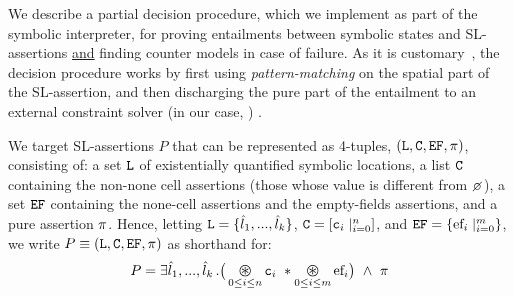 
We describe a partial decision procedure, which we  
implement as part of the \jsil symbolic interpreter, for proving entailments 
between symbolic states and SL-assertions \underline{and} finding counter 
models in case of failure.  
As it is customary~\cite{javert}, the decision procedure works by first using \emph{pattern-matching} 
on the spatial part of the SL-assertion, and then discharging the pure part of the 
entailment to an external constraint solver (in our case, \rosette) . 

We target SL-assertions $P$ that can be represented as 4-tuples,
$(\mathtt{L}, \mathtt{C}, \mathtt{EF}, \pi)$, consisting of: 
 a set $\mathtt{L}$ of existentially quantified symbolic locations, 
 a list $\mathtt{C}$ containing the non-none cell assertions (those whose value is different from $\none$), 
 a set $\mathtt{EF}$ containing the none-cell assertions and the empty-fields assertions, and
 a pure assertion $\pi$. 
Hence, letting $\mathtt{L} = \{ \hat{l}_1, ..., \hat{l}_k \}$, $\mathtt{C} = [ \mathtt{c}_i \mid_{i = 0}^n ]$, and
$\mathtt{EF} = \{\mathtt{\text{ef}}_i \mid_{i = 0}^m \}$, we write $P \equiv (\mathtt{L}, \mathtt{C}, \mathtt{EF}, \pi)$ as shorthand for: 
{\small \begin{equation*}
P = \exists \sloc_1, ..., \sloc_k \, . \big( \bigoast_{0 \leq i \leq n} \cell_i \ \sep  \bigoast_{0 \leq i \leq m} \efa_i \big) \ \wedge \ \pfs
\end{equation*}}

